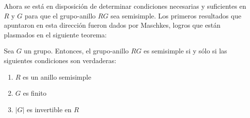 Ahora se está en disposición de determinar condiciones necesarias y suficientes en $R$ y $G$ para que el grupo-anillo $RG$ sea semisimple. Los primeros resultados que apuntaron en esta dirección fueron dados por Maschkes, logros que están plasmados en el siguiente teorema:

\begin{teorema}[Maschke]
Sea $G$ un grupo. Entonces, el grupo-anillo $RG$ es semisimple si y sólo si las siguientes condiciones son verdaderas:
\begin{enumerate}
\item $R$ es un anillo semisimple
\item $G$ es finito
\item $|G|$ es invertible en $R$
\end{enumerate}
\end{teorema}

